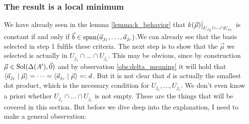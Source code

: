 \subsubsection{The result is a local minimum}
We have already seen in the lemma \ref{lemma:k_behavior} that $\restrict{k(\vec\mu)}{U_{j_1}\cap \dots \cap U_{j_r}}$ is constant if and only if $\vec b \in \operatorname{span}(\vec a_{j_1}, \dots, \vec a_{j_r})$.We can already see that the basis selected in step 1 fulfils these criteria. The next step is to show that the $\vec\mu$ we selected is actually in $U_{j_1} \cap \dots \cap U_{j_r}$. This may be obvious, since by construction $\vec\mu \in \operatorname{Sol}(\Delta(A'), \vec 0)$ and by observation \ref{obs:delta_meaning} it will hold that $\langle \vec a_{j_1} \mid \vec\mu \rangle = \dots = \langle \vec a_{j_r} \mid \vec\mu \rangle =: d$. But it is not clear that $d$ is actually the smallest dot product, which is the necessary condition for $U_{j_1}, \dots, U_{j_r}$. We don't even know a priori whether ${U_{j_1} \cap \dots \cap U_{j_r}}$ is not empty. These are the things that will be covered in this section. But before we dive deep into the explanation, I need to make a general observation:

